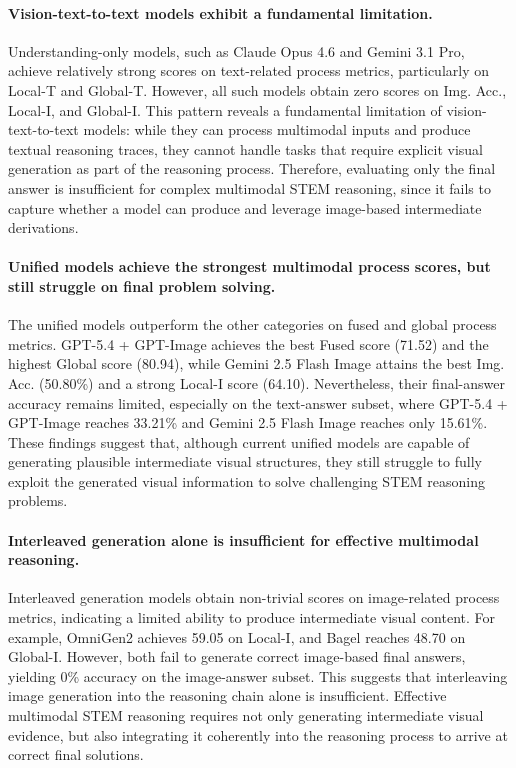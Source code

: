 \documentclass[11pt]{article}
\begin{document}
\paragraph{Vision-text-to-text models exhibit a fundamental limitation.}
Understanding-only models, such as Claude Opus 4.6 and Gemini 3.1 Pro, achieve relatively strong scores on text-related process metrics, particularly on Local-T and Global-T. However, all such models obtain zero scores on Img. Acc., Local-I, and Global-I. This pattern reveals a fundamental limitation of vision-text-to-text models: while they can process multimodal inputs and produce textual reasoning traces, they cannot handle tasks that require explicit visual generation as part of the reasoning process. Therefore, evaluating only the final answer is insufficient for complex multimodal STEM reasoning, since it fails to capture whether a model can produce and leverage image-based intermediate derivations.

\paragraph{Unified models achieve the strongest multimodal process scores, but still struggle on final problem solving.}
The unified models outperform the other categories on fused and global process metrics. GPT-5.4 + GPT-Image achieves the best Fused score (71.52) and the highest Global score (80.94), while Gemini 2.5 Flash Image attains the best Img. Acc. (50.80\%) and a strong Local-I score (64.10). Nevertheless, their final-answer accuracy remains limited, especially on the text-answer subset, where GPT-5.4 + GPT-Image reaches 33.21\% and Gemini 2.5 Flash Image reaches only 15.61\%. These findings suggest that, although current unified models are capable of generating plausible intermediate visual structures, they still struggle to fully exploit the generated visual information to solve challenging STEM reasoning problems.

\paragraph{Interleaved generation alone is insufficient for effective multimodal reasoning.}
Interleaved generation models obtain non-trivial scores on image-related process metrics, indicating a limited ability to produce intermediate visual content. For example, OmniGen2 achieves 59.05 on Local-I, and Bagel reaches 48.70 on Global-I. However, both fail to generate correct image-based final answers, yielding 0\% accuracy on the image-answer subset. This suggests that interleaving image generation into the reasoning chain alone is insufficient. Effective multimodal STEM reasoning requires not only generating intermediate visual evidence, but also integrating it coherently into the reasoning process to arrive at correct final solutions.
\end{document}
